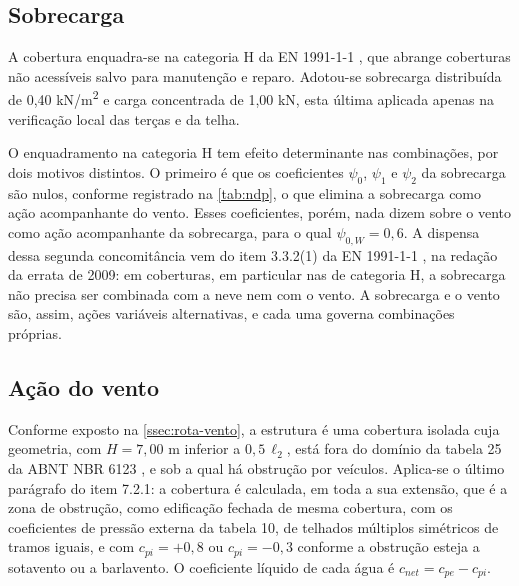 \subsection{Sobrecarga}\label{ssec:sobrecarga}

A cobertura enquadra-se na categoria H da EN 1991-1-1 \cite{EN1991-1-1:2002},
que abrange coberturas não acessíveis salvo para manutenção e reparo. Adotou-se
sobrecarga distribuída de 0,40 kN/m\textsuperscript{2} e carga concentrada de
1,00 kN, esta última aplicada apenas na verificação local das terças e da telha.

O enquadramento na categoria H tem efeito determinante nas combinações, por dois
motivos distintos. O primeiro é que os coeficientes $\psi_0$, $\psi_1$ e
$\psi_2$ da sobrecarga são nulos, conforme registrado na \autoref{tab:ndp}, o
que elimina a sobrecarga como ação acompanhante do vento. Esses coeficientes,
porém, nada dizem sobre o vento como ação acompanhante da sobrecarga, para o qual
$\psi_{0,W} = 0{,}6$. A dispensa dessa segunda concomitância vem do item
3.3.2(1) da EN 1991-1-1 \cite{EN1991-1-1:2002}, na redação da errata de 2009:
em coberturas, em particular nas de categoria H, a sobrecarga não precisa ser
combinada com a neve nem com o vento. A sobrecarga e o vento são, assim, ações
variáveis alternativas, e cada uma governa combinações próprias.

\subsection{Ação do vento}\label{ssec:acao-vento}

Conforme exposto na \autoref{ssec:rota-vento}, a estrutura é uma cobertura
isolada cuja geometria, com $H = 7{,}00$ m inferior a $0{,}5\,\ell_2$, está fora do
domínio da tabela 25 da ABNT NBR 6123 \cite{NBR6123:2023}, e sob a qual há
obstrução por veículos. Aplica-se o último parágrafo do item 7.2.1: a cobertura
é calculada, em toda a sua extensão, que é a zona de obstrução, como edificação
fechada de mesma cobertura, com os coeficientes de pressão externa da tabela 10,
de telhados múltiplos simétricos de tramos iguais, e com $c_{pi} = +0{,}8$ ou
$c_{pi} = -0{,}3$ conforme a obstrução esteja a sotavento ou a barlavento. O
coeficiente líquido de cada água é $c_{net} = c_{pe} - c_{pi}$.

